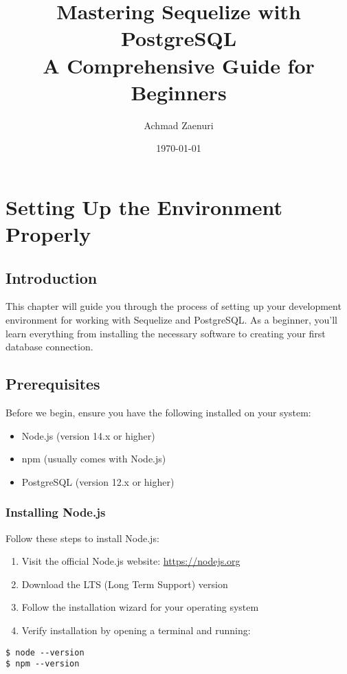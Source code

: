 \documentclass[12pt,a4paper]{book}
\title{Mastering Sequelize with PostgreSQL\\
	\large A Comprehensive Guide for Beginners}
\author{Achmad Zaenuri}
\date{\today}
\begin{document}
	
	\maketitle
	\tableofcontents
	
	
	\chapter{Setting Up the Environment Properly}
	
	\section{Introduction}
	This chapter will guide you through the process of setting up your development environment for working with Sequelize and PostgreSQL. As a beginner, you'll learn everything from installing the necessary software to creating your first database connection.
	
	\section{Prerequisites}
	Before we begin, ensure you have the following installed on your system:
	\begin{itemize}
		\item Node.js (version 14.x or higher)
		\item npm (usually comes with Node.js)
		\item PostgreSQL (version 12.x or higher)
	\end{itemize}
	
	\subsection{Installing Node.js}
	Follow these steps to install Node.js:
	\begin{enumerate}
		\item Visit the official Node.js website: \url{https://nodejs.org}
		\item Download the LTS (Long Term Support) version
		\item Follow the installation wizard for your operating system
		\item Verify installation by opening a terminal and running:
	\end{enumerate}
	
	\begin{verbatim}
$ node --version
$ npm --version
	\end{verbatim}
	
\end{document}
